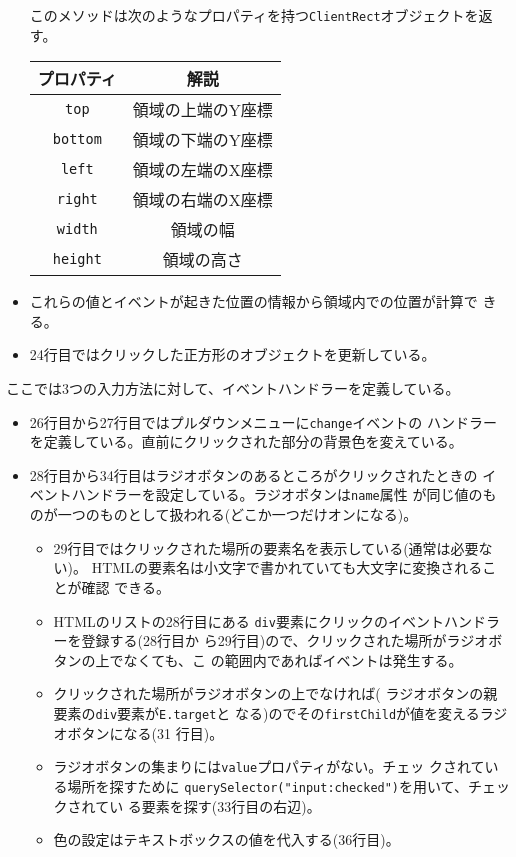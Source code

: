\begin{Exec}
\begin{itemize}
       このメソッドは次のようなプロパティを持つ\texttt{ClientRect}オブジェクトを返す。
\begin{center}
\begin{tabular}{|c|c|}\hline
プロパティ&\multicolumn{1}{c|}{解説} \\\hline
 \texttt{top}&領域の上端のY座標 \\\hline
 \texttt{bottom}&領域の下端のY座標 \\\hline
 \texttt{left}& 領域の左端のX座標\\\hline
 \texttt{right}& 領域の右端のX座標\\\hline
 \texttt{width}& 領域の幅\\\hline
 \texttt{height}& 領域の高さ\\\hline
\end{tabular}
\end{center}
 \item これらの値とイベントが起きた位置の情報から領域内での位置が計算で
       きる。
 \item 24行目ではクリックした正方形のオブジェクトを更新している。
\end{itemize}
ここでは3つの入力方法に対して、イベントハンドラーを定義している。
 \begin{itemize}
 \item 26行目から27行目ではプルダウンメニューに\texttt{change}イベントの
       ハンドラーを定義している。直前にクリックされた部分の背景色を変えている。
 \item 28行目から34行目はラジオボタンのあるところがクリックされたときの
       イベントハンドラーを設定している。ラジオボタンは\texttt{name}属性
       が同じ値のものが一つのものとして扱われる(どこか一つだけオンになる)。
\begin{itemize}
 \item 29行目ではクリックされた場所の要素名を表示している(通常は必要ない)。
       HTMLの要素名は小文字で書かれていても大文字に変換されることが確認
       できる。
 \item HTMLのリストの28行目にある
       \texttt{div}要素にクリックのイベントハンドラーを登録する(28行目か
       ら29行目)ので、クリックされた場所がラジオボタンの上でなくても、こ
       の範囲内であればイベントは発生する。
 \item クリックされた場所がラジオボタンの上でなければ(
       ラジオボタンの親要素の\texttt{div}要素が\texttt{E.target}と
       なる)のでその\texttt{firstChild}が値を変えるラジオボタンになる(31
       行目)。
 \item ラジオボタンの集まりには\texttt{value}プロパティがない。チェッ
       クされている場所を探すために
       \texttt{querySelector("input:checked")}を用いて、チェックされてい
       る要素を探す(33行目の右辺)。
 \item 色の設定はテキストボックスの値を代入する(36行目)。
\end{itemize}
 \end{itemize}
\end{Exec}
